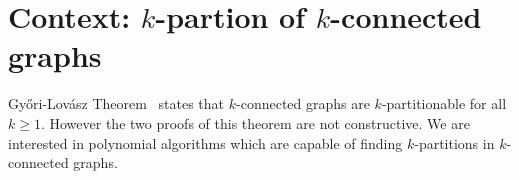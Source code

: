 \section{Context: $k$-partion of $k$-connected graphs}
Gy{\H o}ri-Lovász Theorem~\cite{GE78,LL77} states that $k$-connected graphs are 
$k$-partitionable for all $k \geq 1$. However the two proofs of this theorem
are not constructive. We are interested in polynomial algorithms which
are capable of finding $k$-partitions in $k$-connected graphs.




